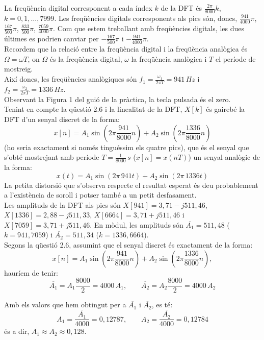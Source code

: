 \documentclass[11pt,a4]{article}
\numberwithin{equation}{section}
\theoremstyle{thmstyle}
\theoremstyle{thmstyle}
\theoremstyle{thmstyle}
\theoremstyle{thmstyle}
\theoremstyle{thmstyle}
\theoremstyle{thmstyle}
\theoremstyle{thmstyle}
\begin{document}
La freqüència digital corresponent a cada índex $k$ de la DFT és $\frac{2\pi}{8000}k$, $k=0,1,\ldots, 7999$. Les freqüències digitals corresponents als pics són, doncs, $\frac{941}{4000}\pi$, $\frac{167}{500}\pi$, $\frac{833}{500}\pi$, $\frac{7059}{4000}\pi$. Com que estem treballant amb freqüències digitals, les dues últimes es podrien canviar per $-\frac{167}{500}\pi$ i $-\frac{941}{4000}\pi$.
\\

Recordem que la relació entre la freqüència digital i la freqüència analògica és $\Omega=\omega T$, on $\Omega$ és la freqüència digital, $\omega$ la freqüència analògica i $T$ el període de mostreig.
\\

Així doncs, les freqüències analògiques són $f_1=\frac{\omega_1}{2\pi T}=941\, Hz$  i $f_2=\frac{\omega_2}{2\pi T}=1336\, Hz$.
\\

Observant la Figura 1 del guió de la pràctica, la tecla pulsada és el zero.
\\

Tenint en compte la qüestió 2.6 i la linealitat de la DFT, $X[k]$ és gairebé la DFT d'un senyal discret de la forma:
$$
x[n] = A_1 \sin(2\pi\frac{941}{8000}n) + A_2 \sin(2\pi\frac{1336}{8000}n)
$$
(ho seria exactament si només tinguéssim els quatre pics), que és el senyal que s'obté mostrejant amb període $T=\frac{1}{8000}\,s$ ($x[n] = x(nT)$) un senyal analògic de la forma:
$$
x(t) = A_1 \sin(2\pi\, 941t) + A_2 \sin(2\pi\, 1336t)
$$
La petita distorsió que s'observa respecte el resultat esperat és deu probablement a l'existència de soroll i potser també a un petit desfasament.
\\

Les amplituds de la DFT als pics són $X[941] = 3,71-j511,46$, $X[1336] = 2,88-j511,33$, $X[6664] = 3,71+j511,46$ i $X[7059] = 3,71+j511,46$. En mòdul, les amplituds són $\overline{A_1}=511,48$ ($k=941,7059$) i $\overline{A_2}=511,34$ ($k=1336,6664$).
\\

Segons la qüestió 2.6, assumint que el senyal discret és exactament de la forma:
$$
x[n] = A_1 \sin(2\pi\frac{941}{8000}n) + A_2 \sin(2\pi\frac{1336}{8000}n),
$$
hauríem de tenir:
$$
\overline{A_1}=A_1\frac{8000}{2}=4000\,A_1,\quad \quad \overline{A_2}=A_2\frac{8000}{2}=4000\,A_2
$$

Amb els valors que hem obtingut per a $\overline{A_1}$ i $\overline{A_2}$, es té:
$$
A_1=\frac{\overline{A_1}}{4000}=0,12787,\quad\quad A_2=\frac{\overline{A_2}}{4000}=0,12784
$$
és a dir, $\overline{A_1}\approx\overline{A_2}\approx0,128$. 
\end{document}
